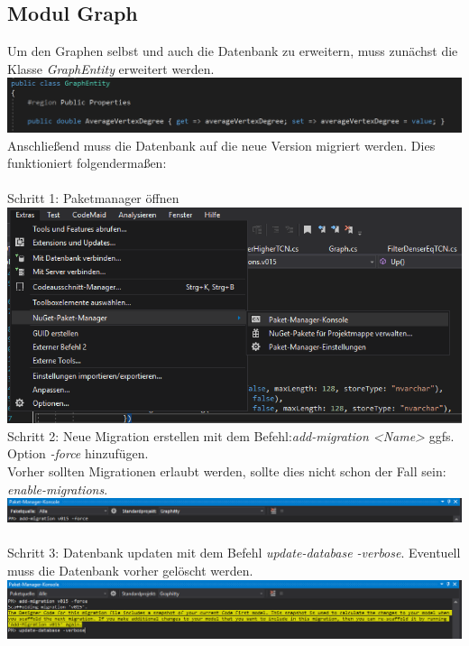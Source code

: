 \documentclass[13pt]{scrreprt}
\begin{document}
\subsection{Modul Graph}
Um den Graphen selbst und auch die Datenbank zu erweitern, muss zunächst die Klasse \textit{GraphEntity} erweitert werden. \\
\includegraphics[scale=0.5,center]{db_ge.PNG}\\
Anschließend muss die Datenbank auf die neue Version migriert werden. Dies funktioniert folgendermaßen:\\\\
Schritt 1: Paketmanager öffnen\\
\includegraphics[scale=0.5,center]{db_pkgmng.PNG}\newpage
Schritt 2: Neue Migration erstellen mit dem Befehl:\textit{add-migration <Name> } ggfs. Option \textit{-force} hinzufügen.
\\
Vorher sollten Migrationen erlaubt werden, sollte dies nicht schon der Fall sein: \textit{enable-migrations}.
\\
\includegraphics[scale=0.5,center]{db_addmig.PNG}\\\\
Schritt 3: Datenbank updaten mit dem Befehl \textit{update-database -verbose}. Eventuell muss die Datenbank vorher gelöscht werden.\\
\includegraphics[scale=0.5,center]{db_updatedb.PNG}\\
\end{document}
